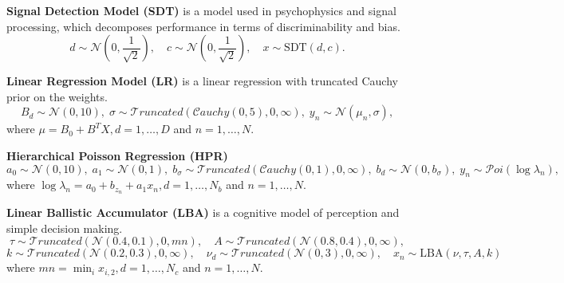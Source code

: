 \documentclass[tablecaption=bottom,wcp]{jmlr} %
\begin{document}
\textbf{Signal Detection Model (SDT)}
is a model used in psychophysics and signal processing, 
which decomposes performance in terms of discriminability and bias.
$$
d \sim \mathcal{N}(0, \frac{1}{\sqrt{2}}), \quad 
c \sim \mathcal{N}(0, \frac{1}{\sqrt{2}}), \quad 
x \sim \text{SDT}(d, c).
$$

\textbf{Linear Regression Model (LR)}
is a linear regression with truncated Cauchy prior on the weights.
$$
B_d \sim \mathcal{N}(0, 10), \;
\sigma \sim \mathcal{T}runcated(\mathcal{C}auchy(0, 5), 0, \infty), \;
y_n \sim \mathcal{N}(\mu_n, \sigma),
$$
where $\mu = B_0 + B^T X, d = 1, \dots, D$ and $n = 1, \dots, N$.

\textbf{Hierarchical Poisson Regression (HPR)}
$$
a_0 \sim \mathcal{N}(0, 10), \;
a_1 \sim \mathcal{N}(0, 1), \;
b_\sigma \sim \mathcal{T}runcated(\mathcal{C}auchy(0, 1), 0, \infty), \;
b_d \sim \mathcal{N}(0, b_\sigma), \;
y_n \sim \mathcal{P}oi(\log\lambda_n),
$$
where $\log\lambda_n = a_0 + b_{z_n} + a_1 x_n, d = 1, \dots, N_b$ and $n = 1, \dots, N$.

\textbf{Linear Ballistic Accumulator (LBA)}
is a cognitive model of perception and simple decision making.
$$
\tau \sim \mathcal{T}runcated(\mathcal{N}(0.4, 0.1), 0, mn), \quad
A \sim \mathcal{T}runcated(\mathcal{N}(0.8, 0.4), 0, \infty),
$$
$$
k \sim \mathcal{T}runcated(\mathcal{N}(0.2, 0.3), 0, \infty), \quad
\nu_d \sim \mathcal{T}runcated(\mathcal{N}(0, 3), 0, \infty), \quad
x_n \sim \text{LBA}(\nu, \tau, A, k)
$$
where $mn=\min_i x_{i,2}, d = 1, \dots, N_c$ and $n = 1, \dots, N$.
\end{document}
